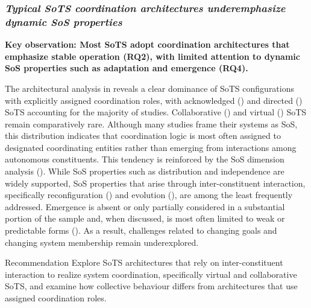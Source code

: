 \subsubsection{\textit{Typical SoTS coordination architectures underemphasize dynamic SoS properties}}

\textbf{Key observation: Most SoTS adopt coordination architectures that emphasize stable operation (RQ2), with limited attention to dynamic SoS properties such as adaptation and emergence (RQ4).}

The architectural analysis in  reveals a clear dominance of SoTS configurations with explicitly assigned coordination roles, with acknowledged () and directed () SoTS accounting for the majority of studies. Collaborative () and virtual () SoTS remain comparatively rare. Although many studies frame their systems as SoS, this distribution indicates that coordination logic is most often assigned to designated coordinating entities rather than emerging from interactions among autonomous constituents. This tendency is reinforced by the SoS dimension analysis (). While SoS properties such as distribution and independence are widely supported, SoS properties that arise through inter-constituent interaction, specifically reconfiguration () and evolution (), are among the least frequently addressed. Emergence is absent or only partially considered in a substantial portion of the sample and, when discussed, is most often limited to weak or predictable forms (). As a result, challenges related to changing goals and changing system membership remain underexplored.

\begin{recoframe}{Recommendation}
Explore SoTS architectures that rely on inter-constituent interaction to realize system coordination, specifically virtual and collaborative SoTS, and examine how collective behaviour differs from architectures that use assigned coordination roles.
\end{recoframe}

